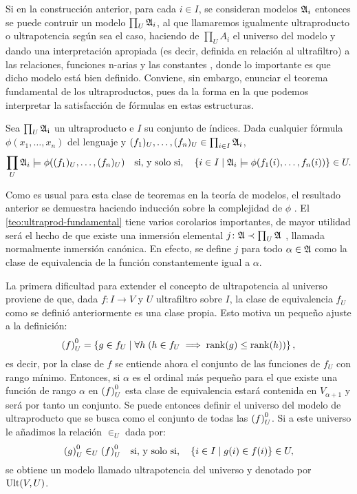 Si en la construcción anterior, para cada $i\in I$, se consideran modelos $\mathfrak { A }_i$ entonces
se puede contruir un modelo $\prod_U \mathfrak { A }_i$, al que llamaremos igualmente
ultraproducto o ultrapotencia según sea el caso,
haciendo de $\prod_U A_i$ el universo del modelo y dando una
interpretación apropiada (es decir, definida en relación al ultrafiltro) a las relaciones,
funciones n-arias y las constantes \autocite[Teorema 4.1.6]{chang_model_2012}, donde lo importante es que
dicho modelo está bien definido. Conviene, sin embargo, enunciar el teorema fundamental de los
ultraproductos, pues da la forma en la que podemos interpretar la satisfacción de fórmulas
en estas estructuras.
\begin{teo}\label{teo:ultraprod-fundamental}
    Sea $\prod_U \mathfrak { A_i }$ un ultraproducto e $I$ su conjunto de índices.
    Dada cualquier fórmula $\phi(x_1,\dots,x_n)$ del lenguaje y $(f_1)_U,\dots,(f_n)_U\in\prod_{i\in I} \mathfrak { A }_i$,
    \[
        \prod_U \mathfrak { A }_i\models\phi((f_1)_U,\dots,(f_n)_U)
        \quad\text{si, y solo si,}\quad
        \left\{ i\in I\mid \mathfrak { A }_i\models\phi(f_1(i),\dots,f_n(i)) \right\}\in U.
    \]
\end{teo}

Como es usual para esta clase de teoremas en la teoría de modelos,
el resultado anterior se demuestra haciendo inducción sobre la complejidad
de $\phi$ \autocite[Teorema 4.1.9]{chang_model_2012}.
El \cref{teo:ultraprod-fundamental} tiene varios corolarios importantes, de mayor
utilidad será el hecho de que existe una inmersión elemental
$j\colon \mathfrak { A }\prec\prod_U\mathfrak { A }$ \autocite[Corolario 4.1.13]{chang_model_2012},
llamada normalmente inmersión canónica.
En efecto, se define $j$
para todo $\alpha\in\mathfrak { A }$ como la clase de equivalencia de la función constantemente
igual a $\alpha$.

La primera dificultad para extender el concepto de ultrapotencia al universo
proviene de que, dada $f\colon I\to V$ y $U$ ultrafiltro sobre $I$,
la clase de equivalencia $f_U$ como se definió anteriormente es una clase propia.
Esto motiva un pequeño ajuste a la definición:
\[
    {(f)}_U^0 = \left\{ g \in f_U\mid \forall h\; (h\in f_U\implies \operatorname{rank}(g)\leq\operatorname{rank}(h)) \right\},
\]
es decir, por la clase de $f$ se entiende ahora el conjunto de las funciones
de $f_U$ con rango mínimo. Entonces, si $\alpha$ es el ordinal más pequeño para
el que existe una función de rango $\alpha$ en ${(f)}_U^0$ esta clase de equivalencia estará
contenida en $V_{\alpha+1}$ y será por tanto un conjunto. Se puede entonces definir
el universo del modelo de ultraproducto que se busca como el conjunto de todas las ${(f)}_U^0$.
Si a este universo le añadimos la relación $\in_U$ dada por:
\[
    {(g)}_U^0 \in_U {(f)}_U^0
    \quad\text{si, y solo si,}\quad
    \left\{ i\in I\mid g(i)\in f(i) \right\}\in U,
\]
se obtiene un modelo llamado ultrapotencia del universo
y denotado por $\operatorname{Ult}(V,U)$.

